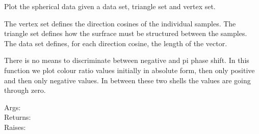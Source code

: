 \documentclass[a4paper,10pt,english]{sphinxmanual}
\begin{document}

\begin{fulllineitems}
\label{ryplotspherical:pyradi.ryplotspherical.plotOSSIMSpherical}
Plot the spherical data given a data set, triangle set and vertex set.

The vertex set defines the direction cosines of the individual samples.
The triangle set defines how the surfrace must be structured between the samples.
The data set defines, for each direction cosine, the length of the vector.

There is no means to discriminate between negative and pi phase shift.
In this function we plot colour ratio values initially in absolute form,
then only positive and then only negative values. In between these two
shells the values are going through zero.
\begin{description}
\item[{Args:}] \leavevmode
{}

\item[{Returns:}] \leavevmode
{}

\item[{Raises:}] \leavevmode
{}

\end{description}

\end{fulllineitems}
\end{document}
